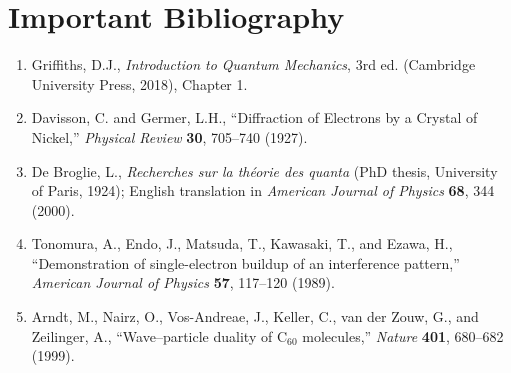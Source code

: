 \section*{Important Bibliography}
\begin{enumerate}
\item Griffiths, D.J., \textit{Introduction to Quantum Mechanics}, 3rd ed. (Cambridge University Press, 2018), Chapter 1.
\item Davisson, C. and Germer, L.H., ``Diffraction of Electrons by a Crystal of Nickel,'' \textit{Physical Review} \textbf{30}, 705--740 (1927).
\item De Broglie, L., \textit{Recherches sur la théorie des quanta} (PhD thesis, University of Paris, 1924); English translation in \textit{American Journal of Physics} \textbf{68}, 344 (2000).
\item Tonomura, A., Endo, J., Matsuda, T., Kawasaki, T., and Ezawa, H., ``Demonstration of single-electron buildup of an interference pattern,'' \textit{American Journal of Physics} \textbf{57}, 117--120 (1989).
\item Arndt, M., Nairz, O., Vos-Andreae, J., Keller, C., van der Zouw, G., and Zeilinger, A., ``Wave--particle duality of C$_{60}$ molecules,'' \textit{Nature} \textbf{401}, 680--682 (1999).
\end{enumerate}

